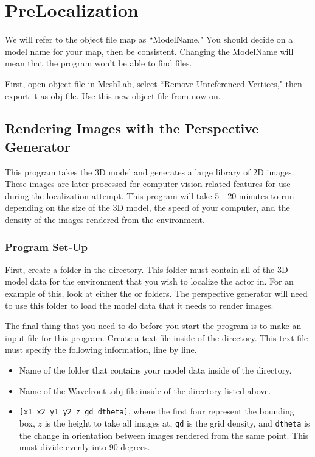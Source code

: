 \documentclass[11pt]{article}
\begin{document}
\section{PreLocalization}

We will refer to the object file map as ``ModelName." You should decide on a model name for your map, then be consistent. Changing the ModelName will mean that the program won't be able to find files. 

First, open object file in MeshLab, select ``Remove Unreferenced Vertices," then export it as obj file. Use this new object file from now on.

\subsection{Rendering Images with the Perspective Generator}

This program takes the 3D model and generates a large library of 2D images. These images are later processed for computer vision related features for use during the localization attempt. This program will take 5 - 20 minutes to run depending on the size of the 3D model, the speed of your computer, and the density of the images rendered from the environment.

\subsubsection{Program Set-Up}
First, create a folder in the  directory. This folder must contain all of the 3D model data for the environment that you wish to localize the actor in. For an example of this, look at either the  or  folders. The perspective generator will need to use this folder to load the model data that it needs to render images.
 
 The final thing that you need to do before you start the program is to make an input file for this program. Create a text file inside of the  directory. This text file must specify the following information, line by line.

 \begin{itemize}
 \item Name of the folder that contains your model data inside of the   directory.
 \item Name of the Wavefront .obj file inside of the directory listed above.
 \item \texttt{[x1 x2 y1 y2 z gd dtheta]}, where the first four represent the bounding box, $z$ is the height to take all images at, \verb.gd. is the grid density, and \verb.dtheta. is the change in orientation between images rendered from the same point. This must divide evenly into 90 degrees.
 \end{itemize}
\end{document}
